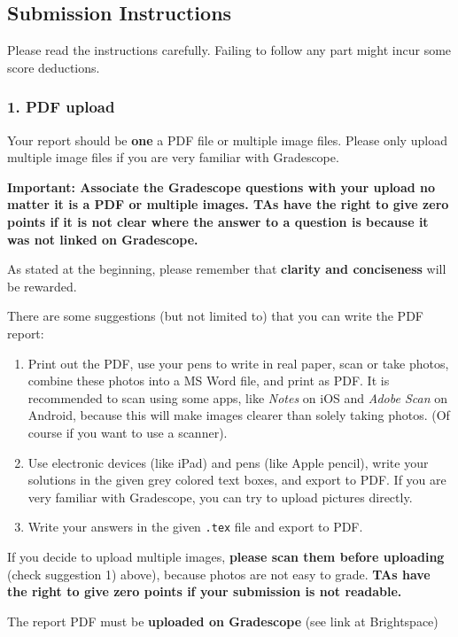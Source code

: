\documentclass{article}
\begin{document}
\newpage

\subsection*{Submission Instructions}

Please read the instructions carefully. Failing to follow any part might incur some score deductions.


\subsubsection*{1. PDF upload}
Your report should be {\bf one} a PDF file or multiple image files. Please only upload multiple image files if you are very familiar with Gradescope.

{\bf Important: Associate the Gradescope questions with your upload no matter it is a PDF or multiple images. TAs have the right to give zero points if it is not clear where the answer to a question is because it was not linked on Gradescope.}

As stated at the beginning, please remember that {\bf clarity and conciseness} will be rewarded.

There are some suggestions (but not limited to) that you can write the PDF report:
\begin{enumerate}[1)]
\item Print out the PDF, use your pens to write in real paper, scan or take photos, combine these photos into a MS Word file, and print as PDF. It is recommended to scan using some apps, like \textit{Notes} on iOS and \textit{Adobe Scan} on Android, because this will make images clearer than solely taking photos. (Of course if you want to use a scanner).
    \item Use electronic devices (like iPad) and pens (like Apple pencil), write your solutions in the given grey colored text boxes, and export to PDF. If you are very familiar with Gradescope, you can try to upload pictures directly.
    \item Write your answers in the given \verb|.tex| file and export to PDF.
\end{enumerate}

If you decide to upload multiple images, {\bf please scan them before uploading} (check suggestion 1) above), because photos are not easy to grade. {\bf TAs have the right to give zero points if your submission is not readable.}

The report PDF must be {\bf uploaded on Gradescope} (see link at Brightspace)
\end{document}
